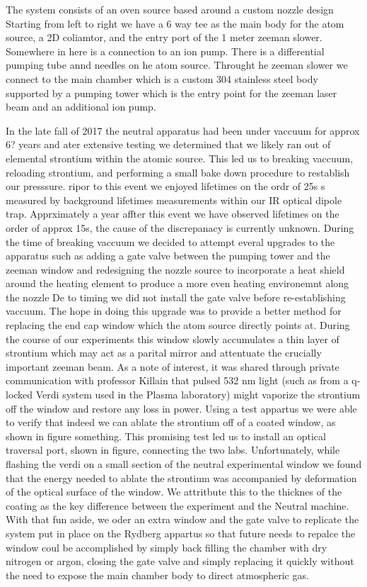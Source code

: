 The system consists of an oven source based around a custom nozzle design
Starting from left to right we have a 6 way tee as the main body for the atom source, a 2D coliamtor, and the entry port of the 1 meter zeeman slower. Somewhere in here is a connection to an ion pump.
There is a differential pumping tube annd needles on he atom source. Throught he zeeman slower we connect to the main chamber which is a custom 304 stainless steel body supported by a pumping tower which is the entry point for the zeeman laser beam and an additional ion pump. 

In the late fall of 2017 the neutral apparatus had been under vaccuum for approx 6? years and ater extensive testing we determined that we likely ran out of elemental strontium within the atomic source. This led us to breaking vaccuum, reloading strontium, and performing a small bake down procedure to restablish our presssure. ripor to this event we enjoyed lifetimes on the ordr of 25s s measured by background lifetimes measurements within our IR optical dipole trap. Apprximately a year affter this event we have observed lifetimes on the order of approx 15s, the cause of the discrepanacy is currently unknown.
During the time of breaking vaccuum we decided to attempt everal upgrades to the apparatus such as adding a gate valve between the pumping tower and the zeeman window and redesigning the nozzle source to incorporate a heat shield around the heating element to produce a more even heating environemnt along the nozzle
De to timing we did not install the gate valve before re-establishing vaccuum. The hope in doing this upgrade was to provide a better method for replacing the end cap window which the atom source directly points at. During the course of our experiments this window slowly accumulates a thin layer of strontium which may act as a parital mirror and attentuate the crucially important zeeman beam. As a note of interest, it was shared through private communication with professor Killain that pulsed 532 nm light (such as from a q-locked Verdi system used in the Plasma laboratory) might vaporize the strontium off the window and restore any loss in power. Using a test appartus we were able to verify that indeed we can ablate the strontium off of a coated window, as shown in figure something.
This promising test led us to install an optical traversal port, shown in figure, connecting the two labs. Unfortunately, while flashing the verdi on a small section of the neutral experimental window we found that the energy needed to ablate the strontium was accompanied by deformation of the optical surface of the window. We attritbute this to the thicknes of the coating as the key difference between the experiment and the Neutral machine.
With that fun aside, we oder an extra window and the gate valve to replicate the system put in place on the Rydberg appartus so that future needs to repalce the window coul be accomplished by simply back filling the chamber with dry nitrogen or argon, closing the gate valve and simply replacing it quickly without the need to expose the main chamber body to direct atmospheric gas. 

